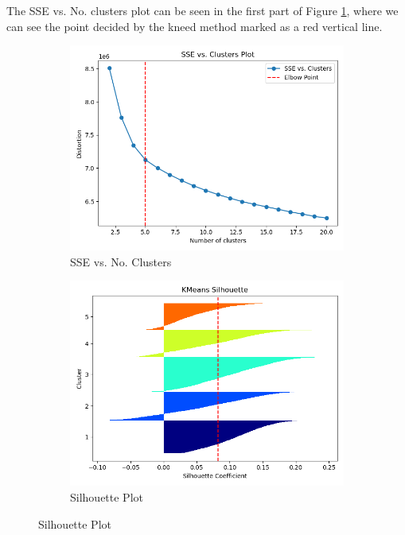 \documentclass[12pt]{article}
\begin{document}
The SSE vs. No. clusters plot can be seen in the first part of Figure \ref{figure1}, where we can see the point decided 
by the kneed method marked as a red vertical line.
\begin{figure}
    \begin{subfigure}{.5\textwidth}
        \includegraphics[width=.95\textwidth]{../results/kmeans/SSE_Cluster_Plot.png}
        \caption{SSE vs. No. Clusters}
        \end{subfigure}%
      \begin{subfigure}{.5\textwidth}
        \includegraphics[width=.95\textwidth]{../results/kmeans/Silhouette_Plot.png}
        \caption{Silhouette Plot}
      \end{subfigure}
      \label{figure1}
\end{figure}
\end{document}
